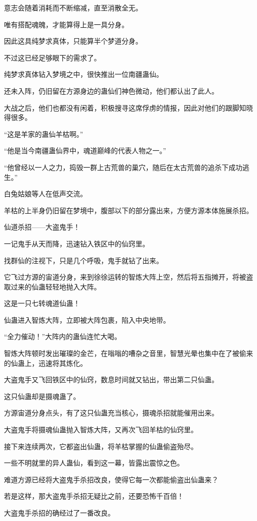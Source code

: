 \begin{this_body}
意志会随着消耗而不断缩减，直至消散全无。

唯有搭配魂魄，才能算得上是一具分身。

因此这具纯梦求真体，只能算半个梦道分身。

不过这已经足够眼下的需求了。

纯梦求真体钻入梦境之中，很快推出一位南疆蛊仙。

还未入阵，仍旧留在方源身边的蛊仙们神色微动，他们都认出了此人。

大战之后，他们也都没有闲着，积极搜寻这席俘虏的情报，因此对他们的跟脚知晓得很多。

“这是羊家的蛊仙羊枯啊。”

“他是当今南疆蛊仙界中，魂道巅峰的代表人物之一。”

“他曾经以一人之力，捣毁一群上古荒兽的巢穴，随后在太古荒兽的追杀下成功逃生。”

白兔姑娘等人在低声交流。

羊枯的上半身仍旧留在梦境中，腹部以下的部分露出来，方便方源本体施展杀招。

仙道杀招——大盗鬼手！

一记鬼手从天而降，迅速钻入铁区中的仙窍里。

找群仙的注视下，只是几个呼吸，鬼手就钻了出来。

它飞过方源的宙道分身，来到徐徐运转的智炼大阵上空，然后将五指摊开，将被盗取过来的仙蛊轻轻地抛入大阵。

这是一只七转魂道仙蛊！

仙蛊进入智炼大阵，立即被大阵包裹，陷入中央地带。

“全力催动！”大阵内的蛊仙连忙大喝。

智炼大阵顿时发出璀璨的金芒，在嗡嗡的嘈杂之音里，智慧光晕也集中在了被偷来的仙蛊上，迅速将其炼化。

大盗鬼手又飞回铁区中的仙窍，数息时间就又钻出，带出第二只仙蛊。

这只仙蛊却是摄魂蛊了。

方源宙道分身点头，有了这只仙蛊充当核心，摄魂杀招就能催用出来。

大盗鬼手将摄魂仙蛊抛入智炼大阵，又再次飞回羊枯的仙窍里。

接下来连续两次，它都盗出仙蛊，将羊枯掌握的仙蛊偷盗殆尽。

一些不明就里的异人蛊仙，看到这一幕，皆露出震惊之色。

难道方源已经将大盗鬼手杀招改良，使得它每一次都能偷盗出仙蛊来？

若是这样，那大盗鬼手杀招无疑比之前，还要恐怖千百倍！

大盗鬼手杀招的确经过了一番改良。


\end{this_body}
